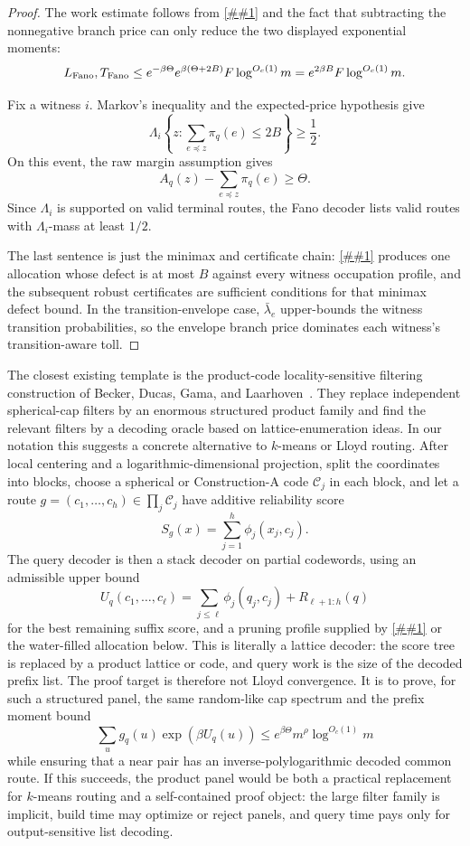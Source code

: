 \documentclass[10pt]{article}
\newcommand{\cref}[1]{\ref{##1}}
\theoremstyle{definition}
\begin{document}
\begin{proof}
   The work estimate follows from
   \cref{lem:fano-biased-prefix-list} and the fact that subtracting the
   nonnegative branch price can only reduce the two displayed exponential
   moments:
   \[
      L_{\rm Fano},T_{\rm Fano}
      \le
      e^{-\beta\Theta}
      e^{\beta(\Theta+2B)}
      F\log^{O_c(1)}m
      =
      e^{2\beta B}F\log^{O_c(1)}m.
   \]

   Fix a witness \(i\).  Markov's inequality and the expected-price hypothesis
   give
   \[
      \Lambda_i\left\{
         z:\sum_{e\preceq z}\pi_q(e)\le 2B
      \right\}\ge\frac12.
   \]
   On this event, the raw margin assumption gives
   \[
      A_q(z)-\sum_{e\preceq z}\pi_q(e)\ge\Theta .
   \]
   Since \(\Lambda_i\) is supported on valid terminal routes, the Fano decoder
   lists valid routes with \(\Lambda_i\)-mass at least \(1/2\).

   The last sentence is just the minimax and certificate chain:
   \cref{lem:robust-waterfilled-minimax} produces one allocation whose defect
   is at most \(B\) against every witness occupation profile, and the
   subsequent robust certificates are sufficient conditions for that minimax
   defect bound.  In the transition-envelope case,
   \(\bar\lambda_e\) upper-bounds the witness transition probabilities, so the
   envelope branch price dominates each witness's transition-aware toll.
\end{proof}

The closest existing template is the product-code locality-sensitive filtering
construction of Becker, Ducas, Gama, and Laarhoven~\cite{BDGL16}.  They replace
independent spherical-cap filters by an enormous structured product family and
find the relevant filters by a decoding oracle based on lattice-enumeration
ideas.  In our notation this suggests a concrete alternative to \(k\)-means or
Lloyd routing.  After local centering and a logarithmic-dimensional projection,
split the coordinates into blocks, choose a spherical or Construction-A code
\(\mathcal C_j\) in each block, and let a route
\(g=(c_1,\ldots,c_h)\in\prod_j\mathcal C_j\) have additive reliability score
\[
   S_g(x)=\sum_{j=1}^h \phi_j(x_j,c_j).
\]
The query decoder is then a stack decoder on partial codewords, using an
admissible upper bound
\[
   U_q(c_1,\ldots,c_\ell)
   =
   \sum_{j\le\ell}\phi_j(q_j,c_j)
   +R_{\ell+1:h}(q)
\]
for the best remaining suffix score, and a pruning profile supplied by
\cref{lem:pruned-budget-thinning} or the water-filled allocation below.  This is
literally a lattice decoder: the score tree is replaced by a product lattice or
code, and query work is the size of the decoded prefix list.  The proof target
is therefore not Lloyd convergence.  It is to prove, for such a structured
panel, the same random-like cap spectrum and the prefix moment bound
\[
   \sum_u g_q(u)\exp(\beta U_q(u))
   \le e^{\beta\Theta}m^\rho\log^{O_c(1)}m
\]
while ensuring that a near pair has an inverse-polylogarithmic decoded common
route.  If this succeeds, the product panel would be both a practical
replacement for \(k\)-means routing and a self-contained proof object: the
large filter family is implicit, build time may optimize or reject panels, and
query time pays only for output-sensitive list decoding.
\end{document}
